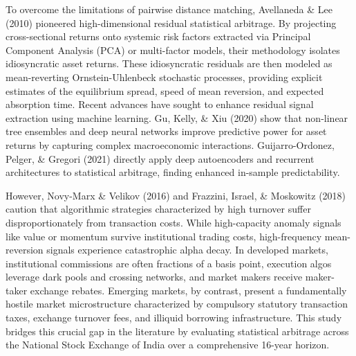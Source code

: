 To overcome the limitations of pairwise distance matching, Avellaneda \& Lee (2010) pioneered high-dimensional residual statistical arbitrage. By projecting cross-sectional returns onto systemic risk factors extracted via Principal Component Analysis (PCA) or multi-factor models, their methodology isolates idiosyncratic asset returns. These idiosyncratic residuals are then modeled as mean-reverting Ornstein-Uhlenbeck stochastic processes, providing explicit estimates of the equilibrium spread, speed of mean reversion, and expected absorption time. Recent advances have sought to enhance residual signal extraction using machine learning. Gu, Kelly, \& Xiu (2020) show that non-linear tree ensembles and deep neural networks improve predictive power for asset returns by capturing complex macroeconomic interactions. Guijarro-Ordonez, Pelger, \& Gregori (2021) directly apply deep autoencoders and recurrent architectures to statistical arbitrage, finding enhanced in-sample predictability.

However, Novy-Marx \& Velikov (2016) and Frazzini, Israel, \& Moskowitz (2018) caution that algorithmic strategies characterized by high turnover suffer disproportionately from transaction costs. While high-capacity anomaly signals like value or momentum survive institutional trading costs, high-frequency mean-reversion signals experience catastrophic alpha decay. In developed markets, institutional commissions are often fractions of a basis point, execution algos leverage dark pools and crossing networks, and market makers receive maker-taker exchange rebates. Emerging markets, by contrast, present a fundamentally hostile market microstructure characterized by compulsory statutory transaction taxes, exchange turnover fees, and illiquid borrowing infrastructure. This study bridges this crucial gap in the literature by evaluating statistical arbitrage across the National Stock Exchange of India over a comprehensive 16-year horizon.

